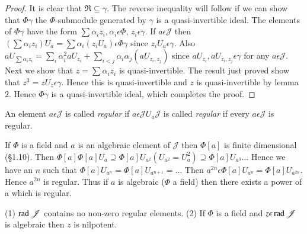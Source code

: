 \begin{proof}
It is clear that $\mathfrak{R}\subseteq \gamma$. The reverse
inequality will follow if we can show that $\Phi\gamma$ the
$\Phi$-submodule generated by $\gamma$ is a quasi-invertible
ideal. The elements of $\Phi\gamma$ have the form
$\sum\alpha_iz_i,\alpha_i\epsilon \Phi$, $z_i\epsilon \gamma$. If
$a\epsilon \mathscr{J}$ then $(\sum
\alpha_iz_i)U_a=\sum\alpha_i(z_iU_a)\epsilon\Phi\gamma$ since
$z_iU_a\epsilon \gamma$. Also
$aU_{\sum\alpha_iz_i}=\sum\limits_{i}\alpha^{2}_iaU_{z_{i}}+\sum\limits_{i<j}\alpha_i
\alpha_j(aU_{z_i,z_j})$ since $aU_{z_{i}},aU_{z_{i},z_{j}}\epsilon
\gamma$ for any $a\epsilon\mathscr{J}$. Next we show that
$z=\sum\alpha_iz_i$ is quasi-invertible. The result just proved show
that $z^{3}= zU_z\epsilon \gamma$. Hence this is quasi-invertible and
$z$ is quasi-invertible by lemma $2$. Hence $\Phi\gamma$ is a
quasi-invertible ideal, which completes the proof.
\end{proof}

\begin{defn}\label{c3:defn3}
An element $a\epsilon \mathscr{J}$ is called {\em regular} if
$a\epsilon \mathscr{J}U_a\mathscr{J}$ is called {\em regular} if every
$a\epsilon \mathscr{J}$ is regular.

If $\Phi$ is a field and $a$ is an algebraic element of $\mathscr{J}$
then $\Phi[a]$ is finite dimensional (\S 1.10). Then
$\Phi[a]\Phi[a]U_a\supseteq
\Phi[a]U_{a^{2}}(U_{a^{2}}=U^{2}_a)\supseteq\Phi[a]U_{a^{3}}\ldots$
Hence we have an $n$ such that
$\Phi[a]U_{a^{n}}=\Phi[a]U_{a^{n+1}}=\ldots$ Then $a^{2n}\epsilon
\Phi[a]U_{a^{n}}=\Phi[a]U_{a^{2n}}$. Hence $a^{2n}$ is regular. Thus
if $a$ is algebraic ($\Phi$ a field) then there exists  a power of a
which is regular.
\end{defn}

\begin{thm}\label{c3:thm3}
(1) $\operatorname{rad} \mathscr{J}$ contains no non-zero regular elements. (2) If
  $\Phi$ is a field and $z\epsilon \operatorname{rad} \mathscr{J}$ is algebraic then
  $z$ is nilpotent.
\end{thm}


